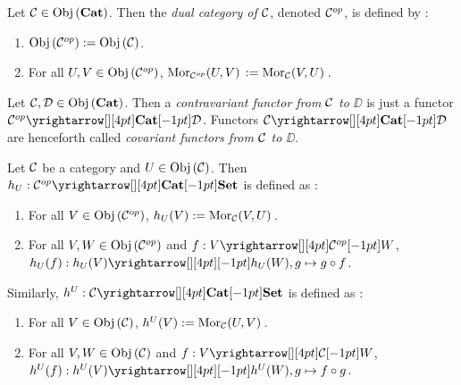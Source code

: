 \begin{dfn}\hypertarget{dual}{}
  
  Let $\mathcal{C} \in \mathrm{Obj}\left(\mathbf{Cat}\right)$. 
  Then the \emph{dual category of $\mathcal{C}$}, denoted $\mathcal{C}^{op}$,
  is defined by : 
  \begin{enumerate}
    \item $\mathrm{Obj}\left(\mathcal{C}^{op}\right) := \mathrm{Obj}\left(\mathcal{C}\right)$. 
    \item For all $U, V \in \mathrm{Obj}\left(\mathcal{C}^{op}\right)$,
    $\mathrm{Mor}_{\mathcal{C}^{op}}(U, V)\, := \mathrm{Mor}_{\mathcal{C}}(V, U)\,$.
  \end{enumerate}
\end{dfn}

\begin{dfn}\hypertarget{contravar}{}
  
  Let $\mathcal{C}, \mathcal{D} \in \mathrm{Obj}\left(\mathbf{Cat}\right)$. 
  Then a \emph{contravariant functor from $\mathcal{C}$ to $\DD$} is 
  just a functor $\map{\CC\op}{\DD}{\CAT}{}$. 
  Functors $\map{\CC}{\DD}{\CAT}{}$ are henceforth called 
  \emph{covariant functors from $\mathcal{C}$ to $\DD$}. 
\end{dfn}

%   

\begin{dfn}\hypertarget{mor_funk}{}
  
  Let $\mathcal{C}$ be a category and $U \in \mathrm{Obj}\left(\mathcal{C}\right)$. 
  Then $h_U : \map{\CC\op}{\SET}{\CAT}{}$ is defined as : 
  \begin{enumerate}
    \item For all $V \in \mathrm{Obj}\left(\mathcal{C}^{op}\right)$, 
    $h_U(V) := \mathrm{Mor}_{\mathcal{C}}(V, U)\,$. 
    \item For all $V, W \in \mathrm{Obj}\left(\mathcal{C}^{op}\right)$ and $f : \map{V}{W}{\CC\op}{}$, 
    $h_U(f) : \map{h_U(V)}{h_U(W)}{}{}, g \mapsto g \circ f$. 
  \end{enumerate}
  Similarly, $h^U : \map{\CC}{\SET}{\CAT}{}$ is defined as : 
  \begin{enumerate}
    \item For all $V \in \mathrm{Obj}\left(\mathcal{C}\right)$, 
    $h^U(V) := \mathrm{Mor}_{\mathcal{C}}(U, V)\,$. 
    \item For all $V, W \in \mathrm{Obj}\left(\mathcal{C}\right)$ and $f : \map{V}{W}{\CC}{}$, 
    $h^U(f) : \map{h^U(V)}{h^U(W)}{}{}, 
    g \mapsto f \circ g$. 
  \end{enumerate}
\end{dfn}

